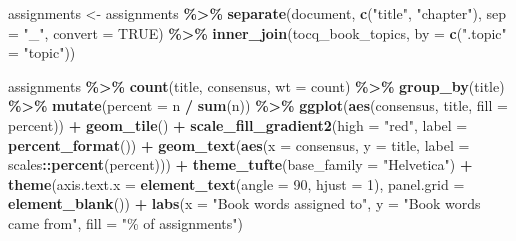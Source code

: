 \documentclass[
]{article}
\newenvironment{Shaded}{\begin{snugshade}}{\end{snugshade}}
\newcommand{\AttributeTok}[1]{\textcolor[rgb]{0.13,0.29,0.53}{#1}}
\newcommand{\ConstantTok}[1]{\textcolor[rgb]{0.56,0.35,0.01}{#1}}
\newcommand{\DecValTok}[1]{\textcolor[rgb]{0.00,0.00,0.81}{#1}}
\newcommand{\FunctionTok}[1]{\textcolor[rgb]{0.13,0.29,0.53}{\textbf{#1}}}
\newcommand{\NormalTok}[1]{#1}
\newcommand{\OtherTok}[1]{\textcolor[rgb]{0.56,0.35,0.01}{#1}}
\newcommand{\SpecialCharTok}[1]{\textcolor[rgb]{0.81,0.36,0.00}{\textbf{#1}}}
\newcommand{\StringTok}[1]{\textcolor[rgb]{0.31,0.60,0.02}{#1}}
\begin{document}
\begin{Shaded}
\begin{Highlighting}[]
\NormalTok{assignments }\OtherTok{\textless{}{-}}\NormalTok{ assignments }\SpecialCharTok{\%\textgreater{}\%}
  \FunctionTok{separate}\NormalTok{(document, }\FunctionTok{c}\NormalTok{(}\StringTok{"title"}\NormalTok{, }\StringTok{"chapter"}\NormalTok{), }\AttributeTok{sep =} \StringTok{"\_"}\NormalTok{, }\AttributeTok{convert =} \ConstantTok{TRUE}\NormalTok{) }\SpecialCharTok{\%\textgreater{}\%}
  \FunctionTok{inner\_join}\NormalTok{(tocq\_book\_topics, }\AttributeTok{by =} \FunctionTok{c}\NormalTok{(}\StringTok{".topic"} \OtherTok{=} \StringTok{"topic"}\NormalTok{))}

\NormalTok{assignments }\SpecialCharTok{\%\textgreater{}\%}
  \FunctionTok{count}\NormalTok{(title, consensus, }\AttributeTok{wt =}\NormalTok{ count) }\SpecialCharTok{\%\textgreater{}\%}
  \FunctionTok{group\_by}\NormalTok{(title) }\SpecialCharTok{\%\textgreater{}\%}
  \FunctionTok{mutate}\NormalTok{(}\AttributeTok{percent =}\NormalTok{ n }\SpecialCharTok{/} \FunctionTok{sum}\NormalTok{(n)) }\SpecialCharTok{\%\textgreater{}\%}
  \FunctionTok{ggplot}\NormalTok{(}\FunctionTok{aes}\NormalTok{(consensus, title, }\AttributeTok{fill =}\NormalTok{ percent)) }\SpecialCharTok{+}
  \FunctionTok{geom\_tile}\NormalTok{() }\SpecialCharTok{+}
  \FunctionTok{scale\_fill\_gradient2}\NormalTok{(}\AttributeTok{high =} \StringTok{"red"}\NormalTok{, }\AttributeTok{label =} \FunctionTok{percent\_format}\NormalTok{()) }\SpecialCharTok{+}
  \FunctionTok{geom\_text}\NormalTok{(}\FunctionTok{aes}\NormalTok{(}\AttributeTok{x =}\NormalTok{ consensus, }\AttributeTok{y =}\NormalTok{ title, }\AttributeTok{label =}\NormalTok{ scales}\SpecialCharTok{::}\FunctionTok{percent}\NormalTok{(percent))) }\SpecialCharTok{+}
  \FunctionTok{theme\_tufte}\NormalTok{(}\AttributeTok{base\_family =} \StringTok{"Helvetica"}\NormalTok{) }\SpecialCharTok{+}
  \FunctionTok{theme}\NormalTok{(}\AttributeTok{axis.text.x =} \FunctionTok{element\_text}\NormalTok{(}\AttributeTok{angle =} \DecValTok{90}\NormalTok{, }\AttributeTok{hjust =} \DecValTok{1}\NormalTok{),}
        \AttributeTok{panel.grid =} \FunctionTok{element\_blank}\NormalTok{()) }\SpecialCharTok{+}
  \FunctionTok{labs}\NormalTok{(}\AttributeTok{x =} \StringTok{"Book words assigned to"}\NormalTok{,}
       \AttributeTok{y =} \StringTok{"Book words came from"}\NormalTok{,}
       \AttributeTok{fill =} \StringTok{"\% of assignments"}\NormalTok{)}
\end{Highlighting}
\end{Shaded}
\end{document}
